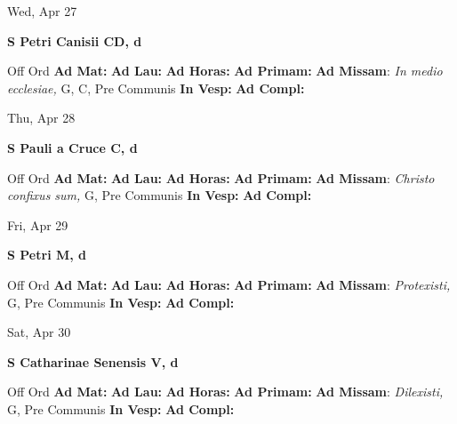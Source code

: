\documentclass[10pt]{article}
\begin{document}
\begin{minipage}{3.5in}
\vspace{2em}\begin{center}
Wed, Apr 27
\end{center}\textbf{ \large S Petri Canisii CD, \textnormal{\normalsize d}}
\begin{justify}
Off Ord
\textbf{Ad Mat: }
\textbf{Ad Lau: }
\textbf{Ad Horas: }
\textbf{Ad Primam: }
\textbf{Ad Missam}: \textit{In medio ecclesiae,} G, C, Pre Communis
\textbf{In Vesp: }
\textbf{Ad Compl: }\end{justify}
\end{minipage}



\begin{minipage}{3.5in}
\vspace{2em}\begin{center}
Thu, Apr 28
\end{center}\textbf{ \large S Pauli a Cruce C, \textnormal{\normalsize d}}
\begin{justify}
Off Ord
\textbf{Ad Mat: }
\textbf{Ad Lau: }
\textbf{Ad Horas: }
\textbf{Ad Primam: }
\textbf{Ad Missam}: \textit{Christo confixus sum,} G, Pre Communis
\textbf{In Vesp: }
\textbf{Ad Compl: }\end{justify}
\end{minipage}



\begin{minipage}{3.5in}
\vspace{2em}\begin{center}
Fri, Apr 29
\end{center}\textbf{ \large S Petri M, \textnormal{\normalsize d}}
\begin{justify}
Off Ord
\textbf{Ad Mat: }
\textbf{Ad Lau: }
\textbf{Ad Horas: }
\textbf{Ad Primam: }
\textbf{Ad Missam}: \textit{Protexisti,} G, Pre Communis
\textbf{In Vesp: }
\textbf{Ad Compl: }\end{justify}
\end{minipage}



\begin{minipage}{3.5in}
\vspace{2em}\begin{center}
Sat, Apr 30
\end{center}\textbf{ \large S Catharinae Senensis V, \textnormal{\normalsize d}}
\begin{justify}
Off Ord
\textbf{Ad Mat: }
\textbf{Ad Lau: }
\textbf{Ad Horas: }
\textbf{Ad Primam: }
\textbf{Ad Missam}: \textit{Dilexisti,} G, Pre Communis
\textbf{In Vesp: }
\textbf{Ad Compl: }\end{justify}
\end{minipage}
\end{document}
